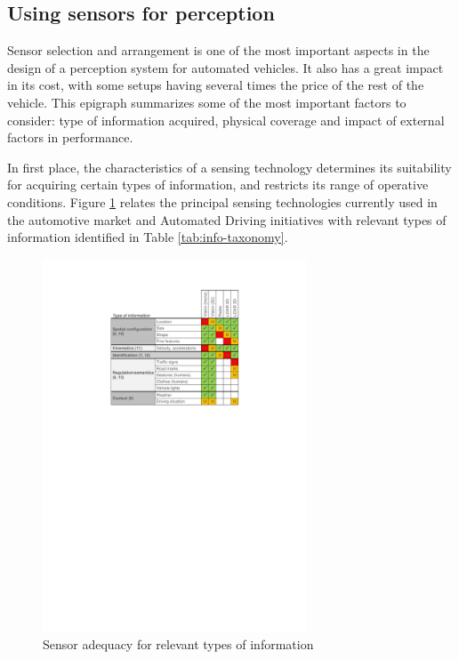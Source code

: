 \subsection{Using sensors for perception}

Sensor selection and arrangement is one of the most important aspects in the 
design of a perception system for automated vehicles. It also has a great impact
in its cost, with some setups having several times the price of the rest of 
the vehicle. 
This epigraph summarizes some of the most important factors to consider: type 
of information acquired, physical coverage and impact of external factors in 
performance.

In first place, the characteristics of a sensing technology determines its 
suitability for acquiring certain types of information, and restricts its range 
of operative conditions.
Figure \ref{fig:information_vs_sensors} relates the principal sensing 
technologies currently used in the automotive market and Automated Driving
initiatives with relevant types of information identified in Table 
\ref{tab:info-taxonomy}.

\begin{figure}[h]
    \centering
    \includegraphics[width=0.7\textwidth]{"img/information_types_sensors"}
    \caption{Sensor adequacy for relevant types of information}
    \label{fig:information_vs_sensors}
\end{figure}

